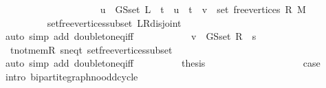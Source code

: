 \begin{isabellebody}
\isanewline
\ \ \ \ \isamarkupfalse%
\isanewline
\ \ \ \ \ \ \isamarkupfalse%
\ {}\isanewline
\ \ \ \ \ \ \isamarkupfalse%
\ {\isachardoublequoteopen}u\ {\isasymin}\ G{\isachardot}{\kern0pt}S{\isachardot}{\kern0pt}set\ L\ {\isasymunion}\ {\isacharbraceleft}{\kern0pt}t{\isacharbraceright}{\kern0pt}\ {\isasymlongleftrightarrow}\ u\ {\isacharequal}{\kern0pt}\ t\ {\isasymand}\ v\ {\isasymin}\ set\ {\isacharparenleft}{\kern0pt}free{\isacharunderscore}{\kern0pt}vertices\ R\ M{\isacharparenright}{\kern0pt}{\isachardoublequoteclose}\isanewline
\ \ \ \ \ \ \ \ \isamarkupfalse%
\ set{\isacharunderscore}{\kern0pt}free{\isacharunderscore}{\kern0pt}vertices{\isacharunderscore}{\kern0pt}subset\ L{\isacharunderscore}{\kern0pt}R{\isacharunderscore}{\kern0pt}disjoint\isanewline
\ \ \ \ \ \ \ \ \isamarkupfalse%
\ {\isacharparenleft}{\kern0pt}auto\ simp\ add{\isacharcolon}{\kern0pt}\ doubleton{\isacharunderscore}{\kern0pt}eq{\isacharunderscore}{\kern0pt}iff{\isacharparenright}{\kern0pt}\isanewline
\ \ \ \ \ \ \isamarkupfalse%
\ \isamarkupfalse%
\ {\isachardoublequoteopen}{\isachardot}{\kern0pt}{\isachardot}{\kern0pt}{\isachardot}{\kern0pt}\ {\isasymlongleftrightarrow}\ v\ {\isasymin}\ G{\isachardot}{\kern0pt}S{\isachardot}{\kern0pt}set\ R\ {\isasymunion}\ {\isacharbraceleft}{\kern0pt}s{\isacharbraceright}{\kern0pt}{\isachardoublequoteclose}\isanewline
\ \ \ \ \ \ \ \ \isamarkupfalse%
\ {}\ t{\isacharunderscore}{\kern0pt}not{\isacharunderscore}{\kern0pt}mem{\isacharunderscore}{\kern0pt}R\ s{\isacharunderscore}{\kern0pt}neq{\isacharunderscore}{\kern0pt}t\ set{\isacharunderscore}{\kern0pt}free{\isacharunderscore}{\kern0pt}vertices{\isacharunderscore}{\kern0pt}subset\isanewline
\ \ \ \ \ \ \ \ \isamarkupfalse%
\ {\isacharparenleft}{\kern0pt}auto\ simp\ add{\isacharcolon}{\kern0pt}\ doubleton{\isacharunderscore}{\kern0pt}eq{\isacharunderscore}{\kern0pt}iff{\isacharparenright}{\kern0pt}\isanewline
\ \ \ \ \ \ \isamarkupfalse%
\ \isamarkupfalse%
\ {\isacharquery}{\kern0pt}thesis\isanewline
\ \ \ \ \ \ \ \ \isacommand{{\isachardot}{\kern0pt}}\isamarkupfalse%
\isanewline
\ \ \ \ \isamarkupfalse%
\isanewline
\ \ \isamarkupfalse%
\isanewline
\ \ \isamarkupfalse%
\ {\isacharquery}{\kern0pt}case\isanewline
\ \ \ \ \isamarkupfalse%
\ {\isacharparenleft}{\kern0pt}intro\ bipartite{\isacharunderscore}{\kern0pt}graph{\isachardot}{\kern0pt}no{\isacharunderscore}{\kern0pt}odd{\isacharunderscore}{\kern0pt}cycle{\isacharparenright}{\kern0pt}\isanewline

\end{isabellebody}
